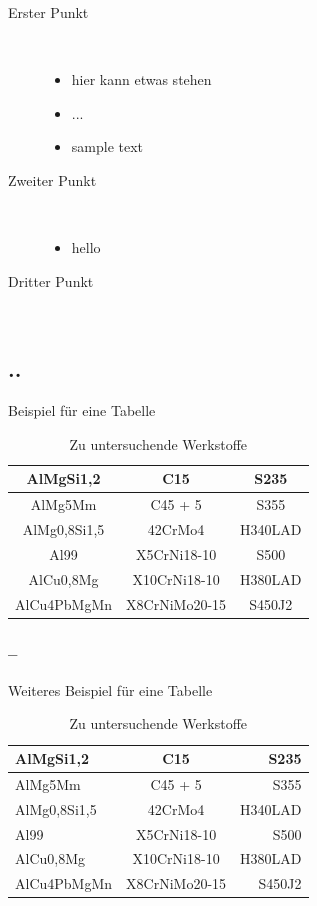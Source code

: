 \documentclass[a4paper, 12pt]{article}
\begin{document}
\begin{description}
  \item[Erster Punkt]~\par
  \begin{itemize}
     \item hier kann etwas stehen
     \item ...
     \item sample text
  \end{itemize}
  \item[Zweiter Punkt]~\par
  \begin{itemize}
      \item hello
  \end{itemize}
  \item[Dritter Punkt]~\par
\end{description}

\subsection{..}
Beispiel für eine Tabelle

\bgroup
\def\arraystretch{1.5}
\begin{table}[!ht]
    \large
    \centering
    \begin{tabular}{|c|c|c|}
    \hline
    AlMgSi1,2 & C15 & S235 \\
    \hline 
    AlMg5Mm & C45 + 5 & S355 \\
    \hline
    AlMg0,8Si1,5 & 42CrMo4 & H340LAD \\
    \hline
    Al99 & X5CrNi18-10 & S500 \\
    \hline
    AlCu0,8Mg & X10CrNi18-10 & H380LAD \\
    \hline
    AlCu4PbMgMn & X8CrNiMo20-15 & S450J2\\
    \hline
    \end{tabular}
    \caption{Zu untersuchende Werkstoffe}
    \label{tab:tabelle1}
\end{table}
\egroup

\subsubsection{--}
Weiteres Beispiel für eine Tabelle

\bgroup
\def\arraystretch{1.5}
\begin{table}[!ht]
    \small
    \centering
    \begin{tabular}{l|c|r}
    AlMgSi1,2 & C15 & S235 \\
    \hline 
    AlMg5Mm & C45 + 5 & S355 \\
    \hline
    AlMg0,8Si1,5 & 42CrMo4 & H340LAD \\
    \hline
    Al99 & X5CrNi18-10 & S500 \\
    \hline
    AlCu0,8Mg & X10CrNi18-10 & H380LAD \\
    \hline
    AlCu4PbMgMn & X8CrNiMo20-15 & S450J2\\
    \end{tabular}
    \caption{Zu untersuchende Werkstoffe}
    \label{tab:tabelle2}
\end{table}
\egroup
\end{document}
